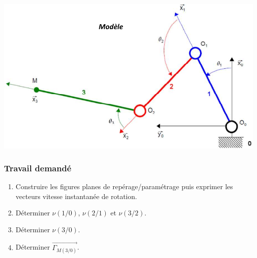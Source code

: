 \begin{center}
\includegraphics[width=.5\textwidth]{png/fig3}
\end{center}

\subsubsection{Travail demandé}
\begin{enumerate}
\item Construire les figures planes de repérage/paramétrage puis exprimer les vecteurs vitesse instantanée de rotation.
\item Déterminer $\nu(1/0)$, $\nu(2/1)$ et $\nu(3/2)$.
\item Déterminer $\nu(3/0)$.
\item Déterminer $\overrightarrow{\Gamma_{M(3/0)}}$.
\end{enumerate}

